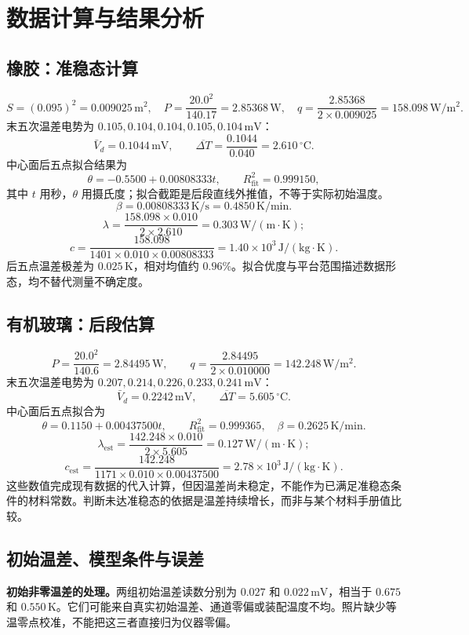\documentclass[UTF8,a4paper,11pt]{ctexart}
\newcommand{\unit}[1]{\,\mathrm{#1}}
\begin{document}
\clearpage
\section{数据计算与结果分析}
\subsection{橡胶：准稳态计算}
\[
S=(0.095)^2=0.009025\unit{m^2},\quad
P=\frac{20.0^2}{140.17}=2.85368\unit W,\quad
q=\frac{2.85368}{2\times0.009025}=158.098\unit{W/m^2}.
\]
末五次温差电势为 $0.105,0.104,0.104,0.105,0.104\unit{mV}$：
\[
\bar V_d=0.1044\unit{mV},\qquad \overline{\Delta T}=\frac{0.1044}{0.040}=2.610\,{}^\circ\mathrm C.
\]
中心面后五点拟合结果为
\[
\theta=-0.5500+0.00808333t,\qquad R_{\mathrm{fit}}^2=0.999150,
\]
其中 $t$ 用秒，$\theta$ 用摄氏度；拟合截距是后段直线外推值，不等于实际初始温度。
\[
\beta=0.00808333\unit{K/s}=0.4850\unit{K/min}.
\]
\[
\lambda=\frac{158.098\times0.010}{2\times2.610}
=\boxed{0.303\unit{W/(m\cdot K)}};
\]
\[
c=\frac{158.098}{1401\times0.010\times0.00808333}
=\boxed{1.40\times10^3\unit{J/(kg\cdot K)}}.
\]
后五点温差极差为 $0.025\unit K$，相对均值约 $0.96\%$。拟合优度与平台范围描述数据形态，均不替代测量不确定度。

\subsection{有机玻璃：后段估算}
\[
P=\frac{20.0^2}{140.6}=2.84495\unit W,\qquad
q=\frac{2.84495}{2\times0.010000}=142.248\unit{W/m^2}.
\]
末五次温差电势为 $0.207,0.214,0.226,0.233,0.241\unit{mV}$：
\[
\bar V_d=0.2242\unit{mV},\qquad\overline{\Delta T}=5.605\,{}^\circ\mathrm C.
\]
中心面后五点拟合为
\[
\theta=0.1150+0.00437500t,\qquad R_{\mathrm{fit}}^2=0.999365,
\quad \beta=0.2625\unit{K/min}.
\]
\[
\lambda_{\mathrm{est}}=\frac{142.248\times0.010}{2\times5.605}
=\boxed{0.127\unit{W/(m\cdot K)}};
\]
\[
c_{\mathrm{est}}=\frac{142.248}{1171\times0.010\times0.00437500}
=\boxed{2.78\times10^3\unit{J/(kg\cdot K)}}.
\]
这些数值完成现有数据的代入计算，但因温差尚未稳定，不能作为已满足准稳态条件的材料常数。判断未达准稳态的依据是温差持续增长，而非与某个材料手册值比较。

\subsection{初始温差、模型条件与误差}
\textbf{初始非零温差的处理。}两组初始温差读数分别为 $0.027$ 和 $0.022\unit{mV}$，相当于 $0.675$ 和 $0.550\unit K$。它们可能来自真实初始温差、通道零偏或装配温度不均。照片缺少等温零点校准，不能把这三者直接归为仪器零偏。
\end{document}
